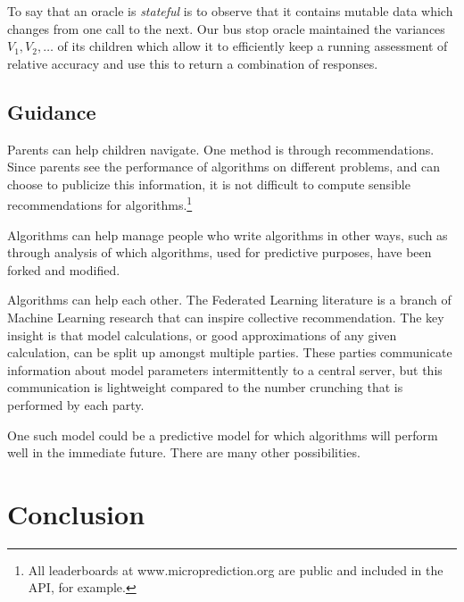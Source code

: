 To say that an oracle is {\em stateful} is to observe that it contains mutable data which changes from one call to the next. Our bus stop oracle maintained the variances $V_1,V_2,\dots$ of its children which allow it to efficiently keep a running assessment of relative accuracy and use this to return a combination of responses. 



\subsection{Guidance}

Parents can help children navigate. One method is through recommendations. Since parents see the performance of algorithms on different problems, and can choose to publicize this information, it is not difficult to compute sensible recommendations for algorithms.\footnote{All leaderboards at www.microprediction.org are public and included in the API, for example.} 

Algorithms can help manage people who write algorithms in other ways, such as through analysis of which algorithms, used for predictive purposes, have been forked and modified. 

Algorithms can help each other. The Federated Learning literature is a branch of Machine Learning research that can inspire collective recommendation. The key insight is that model calculations, or good approximations of any given calculation, can be split up amongst multiple parties. These parties communicate information about model parameters intermittently to a central server, but this communication is lightweight compared to the number crunching that is performed by each party. 

One such model could be a predictive model for which algorithms will perform well in the immediate future. There are many other possibilities. 

\section{Conclusion}












